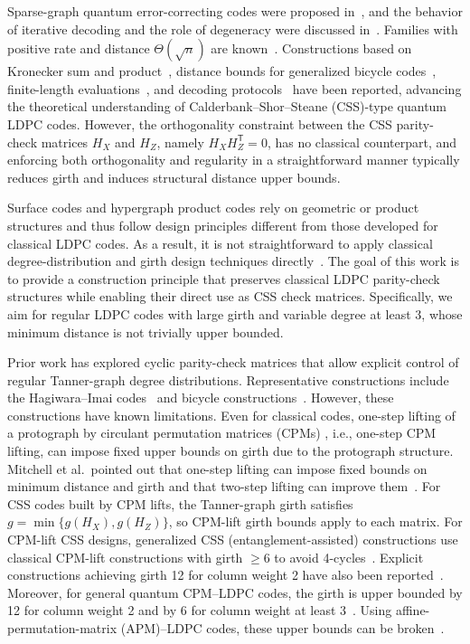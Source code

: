 \documentclass[a4paper,onecolumn,11pt,accepted=2026-08-03]{quantumarticle}
\renewcommand\[{\begin{equation}}
\renewcommand\]{\end{equation}}
\theoremstyle{definition}
\begin{document}
Sparse-graph quantum error-correcting codes were proposed in~\cite{MacKay2004}, and the behavior of iterative decoding and the role of degeneracy were discussed in~\cite{PoulinChung2008}. Families with positive rate and distance $\Theta(\sqrt{n})$ are known~\cite{TillichZemor2014}. Constructions based on Kronecker sum and product~\cite{KovalevPryadko2013}, distance bounds for generalized bicycle  codes~\cite{WangPryadko2022}, finite-length evaluations~\cite{Mostad2025}, and decoding protocols~\cite{Lin2025} have been reported, advancing the theoretical understanding of   Calderbank--Shor--Steane (CSS)-type quantum LDPC  codes. However, the orthogonality constraint between the CSS parity-check matrices $H_X$ and $H_Z$, namely $H_X H_Z^{\mathsf T}=0$, has no classical counterpart, and enforcing both orthogonality and regularity in a straightforward manner typically reduces girth and induces structural distance upper bounds.

Surface codes and hypergraph product  codes rely on geometric or product structures and thus follow design principles different from those developed for classical LDPC codes. As a result, it is not straightforward to apply classical degree-distribution and girth design techniques directly~\cite{Fowler2012,TillichZemor2014,RichardsonUrbanke2008}. The goal of this work is to provide a construction principle that preserves classical LDPC parity-check structures while enabling their direct use as CSS check matrices. Specifically, we aim for regular LDPC codes with large girth and variable degree at least 3, whose minimum distance is not trivially upper bounded.

Prior work has explored cyclic parity-check matrices that allow explicit control of regular Tanner-graph degree distributions. Representative constructions include the Hagiwara--Imai codes~\cite{HagiwaraImai2007} and bicycle constructions~\cite{MacKay2004,KovalevPryadko2013,WangPryadko2022}. However, these constructions have known limitations. Even for classical codes, one-step lifting of a protograph  by circulant permutation matrices (CPMs)  , i.e., one-step CPM lifting,  can impose fixed upper bounds on girth due to the protograph structure. Mitchell et al.\ pointed out that one-step lifting can impose fixed bounds on minimum distance and girth and that two-step lifting can improve them~\cite{MitchellSmarandacheCostello2014}. For CSS codes   built by CPM lifts, the  Tanner-graph girth satisfies $g=\min\{g(H_X),g(H_Z)\}$, so   CPM-lift  girth bounds apply to each matrix. For   CPM-lift  CSS designs, generalized CSS (entanglement-assisted) constructions use classical   CPM-lift  constructions with girth $\ge 6$ to avoid 4-cycles~\cite{HsiehBrunDevetak2009}. Explicit constructions achieving girth 12 for column weight 2 have also been reported~\cite{KomotoKasai2025}. Moreover, for general quantum CPM--LDPC codes, the girth is upper bounded by 12 for column weight 2 and by 6 for column weight at least 3~\cite{AmirzadePanarioSadeghi2024}. Using   affine-permutation-matrix (APM)--LDPC  codes, these upper bounds can be broken~\cite{KomotoKasai2025,KasaiISTC2025}.
\end{document}
